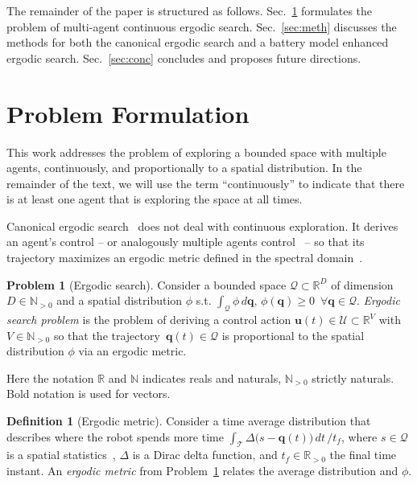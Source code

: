 \documentclass[letterpaper,10pt,conference,twoside]{IEEEtran}
\theoremstyle{definition}
\newtheorem{defn}{Definition}[section]
\newtheorem{pb}{Problem}[section]
\begin{document}
The remainder of the paper is structured as follows. Sec.~\ref{sec:pb} formulates the problem of multi-agent continuous ergodic search. Sec.~\ref{sec:meth} discusses the methods for both the canonical ergodic search and a battery model enhanced ergodic search. Sec.~\ref{sec:conc} concludes and proposes future directions.


\section{Problem Formulation}\label{sec:pb}
\noindent
This work addresses the problem of exploring a bounded space with multiple agents, continuously, and proportionally to a spatial distribution. 
%
In the remainder of the text, we will use the term ``continuously'' to indicate that there is at least one agent that is exploring the space at all times.

Canonical ergodic search~\cite{mathew2011metrics,miller2013trajectory,abraham2021ergodic,miller2016ergodic,dressel2018optimality,torre2016ergodic,shetty2022ergodic} does not deal with continuous exploration. It derives an agent's control -- or analogously multiple agents control~\cite{prabhakar2020ergodic,coffin2022multi,lerch2023safety,abraham2018decentralized,patel2021multi} -- so that its trajectory maximizes an ergodic metric defined in the spectral domain~\cite{calinon2020mixture}.

\begin{pb}[Ergodic search]\label{pb:ergo}
  Consider a bounded space $\mathcal{Q}\subset\mathbb{R}^D$ of dimension $D\in\mathbb{N}_{>0}$ and a spatial distribution $\phi$ s.t. $\int_{\mathcal{Q}}\phi\,d\mathbf{q},\,\phi(\mathbf{q})\geq 0\,\,\, \forall \mathbf{q}\in\mathcal{Q}$.
  \textit{Ergodic search problem} is the problem of deriving a control action $\mathbf{u}(t)\in\mathcal{U}\subset\mathbb{R}^V$ with $V\in\mathbb{N}_{>0}$ so that the trajectory~$\mathbf{q}(t)\in\mathcal{Q}$ is proportional to the spatial distribution $\phi$ via an ergodic metric.
\end{pb}

Here the notation $\mathbb{R}$ and $\mathbb{N}$ indicates reals and naturals, $\mathbb{N}_{>0}$ strictly naturals. Bold notation is used for vectors.

\begin{defn}[Ergodic metric]\label{def:ergom}
  Consider a time average distribution that describes where the robot spends more time $\int_{\mathcal{T}}{\Delta\big(s-\mathbf{q}(t)\big)}\,dt\,/t_f$, 
  where $s\in\mathcal{Q}$ is a spatial statistics~\cite{abraham2018decentralized}, $\Delta$ is a Dirac delta function, and $t_f\in\mathbb{R}_{>0}$ the final time instant. 
  An \textit{ergodic metric} from Problem~\ref{pb:ergo} relates the average distribution and $\phi$.
\end{defn}
\end{document}
